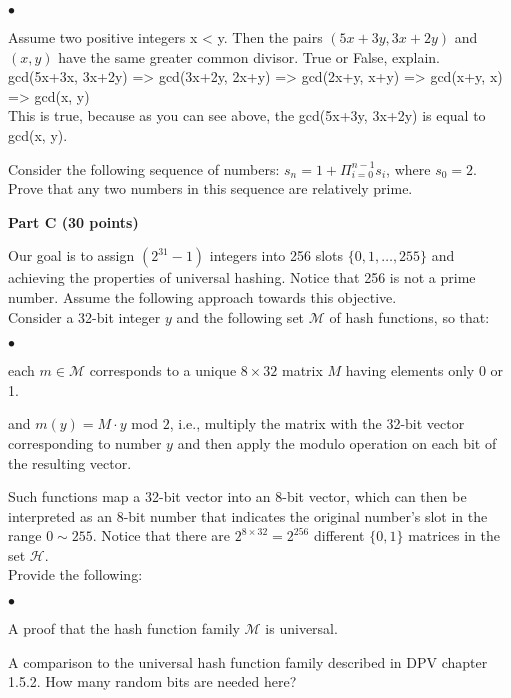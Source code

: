 \documentclass{article}
\newenvironment{myitem}{\begin{list}{$\bullet$}
{\setlength{\itemsep}{-0pt}
\setlength{\topsep}{0pt}
\setlength{\labelwidth}{0pt}
\setlength{\leftmargin}{10pt}
\setlength{\parsep}{-0pt}
\setlength{\itemsep}{0pt}
\setlength{\partopsep}{0pt}}}%
{\end{list}}
\begin{document}
\begin{myitem}
\item Assume two positive integers x < y. Then the pairs
  $(5x+3y,3x+2y)$ and $(x,y)$ have the same greater common
  divisor. True or False, explain.\\

gcd(5x+3x, 3x+2y) => gcd(3x+2y, 2x+y) => gcd(2x+y, x+y) => gcd(x+y, x) => gcd(x, y)\\
This is true, because as you can see above, the gcd(5x+3y, 3x+2y) is equal to gcd(x, y).\\

\item Consider the following sequence of numbers: $s_n = 1 +
  \Pi_{i=0}^{n-1} s_i$, where $s_0 = 2$. Prove that any two numbers in
  this sequence are relatively prime.\\
\end{myitem}

\begin{center}
{\bf Part C (30 points)}
\end{center}

 Our goal is to assign $(2^{31}-1)$ integers
into 256 slots $\{0,1, \dots, 255\}$ and achieving the properties of
universal hashing. Notice that 256 is not a prime number. Assume the
following approach towards this objective.\\

\noindent Consider a 32-bit integer $y$ and the following set $\mathcal{M}$ of
hash functions, so that:
\begin{myitem}
\item each $m \in \mathcal{M}$ corresponds to a unique $8 \times 32$
  matrix $M$ having elements only 0 or 1.
\item and $m(y) = M \cdot y$ mod $2$, i.e., multiply the matrix with
  the 32-bit vector corresponding to number $y$ and then apply the
  modulo operation on each bit of the resulting vector.\\
\end{myitem}

\noindent Such functions map a 32-bit vector into an 8-bit vector,
which can then be interpreted as an 8-bit number that indicates the
original number's slot in the range $0 \sim 255$. Notice that there
are $2^{8\times32}=2^{256}$ different $\{0,1\}$ matrices in the set
$\mathcal{H}$.\\

\noindent Provide the following:
\begin{myitem}
\item A proof that the hash function family $\mathcal{M}$ is
  universal.

\item A comparison to the universal hash function family described in
  DPV chapter 1.5.2. How many random bits are needed here?\\
\end{myitem}
\end{document}
